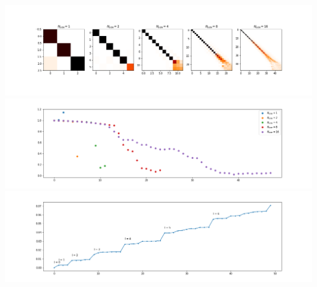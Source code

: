 \begin{minipage}{.5\textwidth}
	\centering
	\includegraphics[width=0.9\linewidth]{../codes/02.HeatKernelGraphLaplacian/HEALPix/06_figures/deepsphere_original.png}
	\includegraphics[width=0.9\linewidth]{../codes/02.HeatKernelGraphLaplacian/HEALPix/06_figures/deepsphere_original_diagonal.png}
	\includegraphics[width=0.9\linewidth]{../codes/02.HeatKernelGraphLaplacian/HEALPix/05_figs/old_results3.png}
	\label{fig:Old spectrum}
\end{minipage}%
